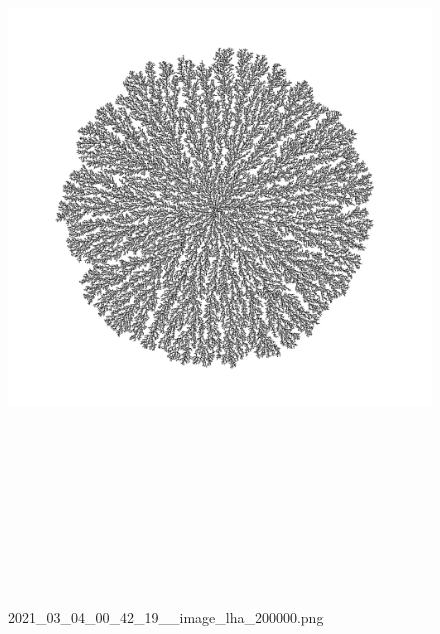 \documentclass[12pt,a4paper]{scrartcl}
\newcommand{\1}{\mathbbm{1}}
\theoremstyle{definition}
\numberwithin{equation}{section}
\begin{document}
\begin{figure}[p]
	\centering
	\centerline{\includegraphics[height=21cm]{images/ia/2021_03_04_00_42_19__image_lha_200000.png}}
	\captionsetup{labelformat=empty}
	\caption{2021\_03\_04\_00\_42\_19\_\_image\_lha\_200000.png}
\end{figure}


\newpage
\end{document}
